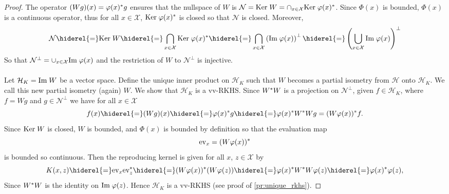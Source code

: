 \begin{proof} 
    The operator $(Wg)(x)=\Phi(x)^\adjoint g$ ensures that the nullspace of $W$
    is $\mathcal{N}=\Ker W=\cap_{x\in\mathcal{X}}\Ker \Phi(x)^\adjoint$. Since
    $\Phi(x)$ is bounded, $\Phi(x)$ is a continuous operator, thus for all
    $x\in\mathcal{X}$, $\Ker \Phi(x)^\adjoint$ is closed so that $\mathcal{N}$
    is closed. Moreover,
    \begin{dmath*}
        \mathcal{N}\hiderel{=}\Ker W\hiderel{=}\bigcap_{x\in\mathcal{X}}\Ker
        \Phi(x)^\adjoint\hiderel{=}\bigcap_{x\in\mathcal{X}}\left(\Ima
        \Phi(x)\right)^{\perp}\hiderel{=}\left(\bigcup_{x\in\mathcal{X}}\Ima
        \Phi(x)\right)^{\perp}
    \end{dmath*}
    So that $\mathcal{N}^\perp=\cup_{x\in\mathcal{X}}\Ima \Phi(x)$ and the
    restriction of $W$ to $\mathcal{N}^{\perp}$ is injective.
    \paragraph{}
    Let $\mathcal{H}_K=\text{Im}\; W$ be a vector space. Define the unique inner
    product on $\mathcal{H}_K$ such that $W$ becomes a partial isometry from
    $\mathcal{H}$ onto $\mathcal{H}_K$. We call this new partial isometry
    (again) $W$. We show that $\mathcal{H}_K$ is a \acl{vv-RKHS}. Since
    $W^* W$ is a projection on $\mathcal{N}^{\perp}$, given
    $f\in\mathcal{H}_K$, where $f=Wg$ and $g\in\mathcal{N}^{\perp}$ we have for
    all $x\in\mathcal{X}$
    \begin{dmath*}
        f(x) \hiderel{=} (Wg)(x)\hiderel{=}\Phi(x)^\adjoint
        g\hiderel{=}\Phi(x)^\adjoint W^\adjoint Wg=(W\Phi(x))^\adjoint f.
    \end{dmath*}
    Since $\text{Ker}\; W$ is closed, $W$ is bounded, and $\Phi(x)$ is bounded by
    definition so that the evaluation map
    \begin{dmath*}
        \text{ev}_x=(W\Phi(x))^\adjoint
    \end{dmath*}
    is bounded so continuous. Then the reproducing kernel is given for all $x$,
    $z\in\mathcal{X}$ by
    \begin{dmath*}
        K(x,z)\hiderel{=}\text{ev}_x\text{ev}_z^\adjoint
        \hiderel{=} (W\Phi(x))^\adjoint(W\Phi(z))
        \hiderel{=}\Phi(x)^\adjoint W^\adjoint W\Phi(z)
        \hiderel{=}\Phi(x)^\adjoint\Phi(z),
    \end{dmath*}
    Since $W^* W$ is the identity on $\Ima \Phi(z)$. Hence
    $\mathcal{H}_K$ is a \ac{vv-RKHS} (see proof of \cref{pr:unique_rkhs}).
\end{proof}
